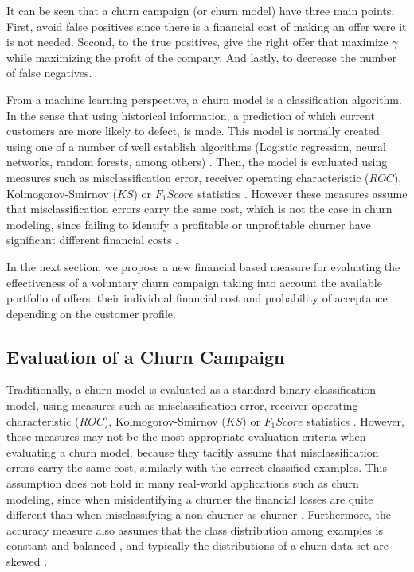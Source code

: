 It can be seen that a churn campaign (or churn model) have three main points. First, avoid false 
positives since there is a financial cost of making an offer were it is not needed. Second, to the 
true positives, give the right offer that maximize $\gamma$ while maximizing the profit of the 
company. And lastly, to decrease the number of false negatives.

From a machine learning perspective, a churn model is a classification algorithm.
In the sense that using historical information, a prediction of which current customers 
are more likely to defect, is made. This model is normally created using one of a number of 
well establish algorithms (Logistic regression, neural networks, random forests, among 
others) \citep{Ngai2009,KhakAbi2010}. Then, the model is evaluated using measures such as 
misclassification error, receiver operating characteristic ($ROC$),  Kolmogorov-Smirnov ($KS$) 
or \mbox{$F_1Score$} statistics \citep{Verbeke2012}. However these measures assume that 
misclassification errors     carry the same cost, which is not the case in churn modeling, since 
failing to identify a profitable or unprofitable churner have significant different financial costs
\citep{Glady2009}. 
	
In the next section, we propose a new financial based measure for evaluating the effectiveness of 
a voluntary churn campaign taking into account the available portfolio of offers, their 
individual 	financial cost and probability of acceptance depending on the customer profile. 


\subsection{Evaluation of a Churn Campaign}
\label{sec:4:1:evaluation}
	
Traditionally, a churn model is evaluated as a standard binary classification model, 
using measures such as misclassification error, receiver operating characteristic ($ROC$),  
Kolmogorov-Smirnov ($KS$) or \mbox{$F_1Score$} statistics \citep{Verbeke2012}.
However, these measures may not be the most appropriate evaluation criteria when  
evaluating a churn model, because they tacitly assume that misclassification errors carry the 
same cost, similarly with the correct classified examples. This assumption does not hold in many 
real-world applications such as churn modeling, since  when misidentifying a churner the financial 
losses are quite different than when misclassifying a non-churner as churner \citep{Glady2009}. 
Furthermore, the accuracy measure also assumes that the class distribution 
among examples is constant and balanced \citep{Provost1998}, and typically the distributions of a 
churn data set are skewed \citep{Verbeke2012}.

